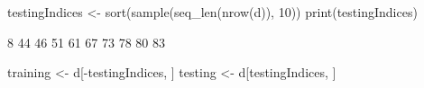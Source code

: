 \begin{Schunk}
% --begin: "pbld3"
\begin{Sinput}
 testingIndices <- sort(sample(seq_len(nrow(d)), 10))
 print(testingIndices)
\end{Sinput}
\begin{Soutput}
 [1]  8 44 46 51 61 67 73 78 80 83
\end{Soutput}
\begin{Sinput}
 training <- d[-testingIndices, ]
 testing <- d[testingIndices, ]
\end{Sinput}
%
% --end: "pbld3"
\end{Schunk}
